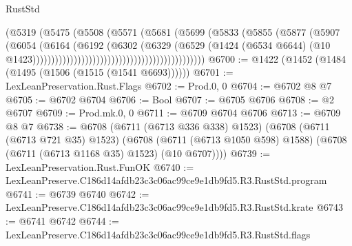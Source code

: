 \begin{lexlean}{RustStd}
\begin{coremodule}
                                                            (@5319
                                                              (@5475
                                                                (@5508
                                                                  (@5571
                                                                    (@5681
                                                                      (@5699
                                                                        (@5833
                                                                          (@5855
                                                                            (@5877
                                                                              (@5907
                                                                                (@6054
                                                                                  (@6164
                                                                                    (@6192
                                                                                      (@6302
                                                                                        (@6329
                                                                                          (@6529
                                                                                            (@1424
                                                                                              (@6534
                                                                                                @6644)
                                                                                              (@10
                                                                                                @1423))))))))))))))))))))))))))))))))))))))))))))))
@6700 := @1422 (@1452 (@1484 (@1495 (@1506 (@1515 (@1541 @6693))))))
@6701 := LexLeanPreservation.Rust.Flags
@6702 := Prod.{0, 0}
@6704 := @6702 @8 @7
@6705 := @6702 @6704
@6706 := Bool
@6707 := @6705 @6706
@6708 := @2 @6707
@6709 := Prod.mk.{0, 0}
@6711 := @6709 @6704 @6706
@6713 := @6709 @8 @7
@6738 := @6708
    (@6711 (@6713 @336 @338) @1523)
    (@6708
      (@6711 (@6713 @721 @35) @1523)
      (@6708 (@6711 (@6713 @1050 @598) @1588) (@6708 (@6711 (@6713 @1168 @35) @1523) (@10 @6707))))
@6739 := LexLeanPreservation.Rust.FunOK
@6740 := LexLeanPreserve.C186d14afdb23c3c06ac99ce9e1db9fd5.R3.RustStd.program
@6741 := @6739 @6740
@6742 := LexLeanPreserve.C186d14afdb23c3c06ac99ce9e1db9fd5.R3.RustStd.krate
@6743 := @6741 @6742
@6744 := LexLeanPreserve.C186d14afdb23c3c06ac99ce9e1db9fd5.R3.RustStd.flags

\end{coremodule}
\end{lexlean}
